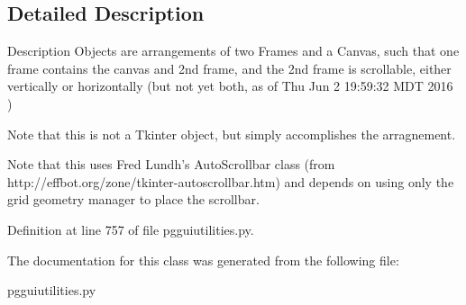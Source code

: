 \subsection{Detailed Description}
\begin{DoxyVerb}Description
Objects are arrangements of two Frames and a 
Canvas, such that one frame contains the 
canvas and 2nd frame, and the 2nd frame 
is scrollable, either vertically or horizontally 
(but not yet both, as of Thu Jun  2 19:59:32 MDT 2016 )


Note that this is not a Tkinter object, but
simply accomplishes the arragnement. 

Note that this uses Fred Lundh's AutoScrollbar class
(from http://effbot.org/zone/tkinter-autoscrollbar.htm)
and depends on using only the grid geometry manager to place
the scrollbar.
\end{DoxyVerb}
 

Definition at line 757 of file pgguiutilities.\+py.



The documentation for this class was generated from the following file\+:\begin{DoxyCompactItemize}
\item 
pgguiutilities.\+py\end{DoxyCompactItemize}
